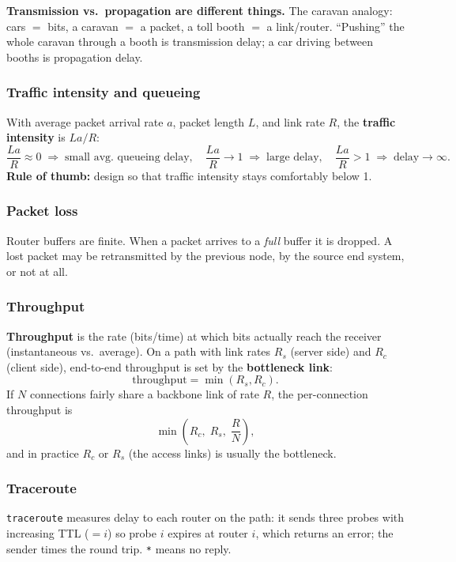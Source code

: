 \documentclass[hidelinks]{article}
\begin{document}
\noindent\textbf{Transmission vs.\ propagation are different things.}
The caravan analogy: cars $=$ bits, a caravan $=$ a packet, a toll booth $=$
a link/router. ``Pushing'' the whole caravan through a booth is transmission
delay; a car driving between booths is propagation delay.

\subsubsection{Traffic intensity and queueing}
With average packet arrival rate $a$, packet length $L$, and link rate $R$,
the \textbf{traffic intensity} is $La/R$:
\[
    \frac{La}{R}\!\approx 0 \;\Rightarrow\; \text{small avg.\ queueing delay},
    \quad
    \frac{La}{R}\!\to 1 \;\Rightarrow\; \text{large delay},
    \quad
    \frac{La}{R} > 1 \;\Rightarrow\; \text{delay} \to \infty.
\]
\textbf{Rule of thumb:} design so that traffic intensity stays comfortably
below 1.

\subsubsection{Packet loss}
Router buffers are finite. When a packet arrives to a \emph{full} buffer it
is dropped. A lost packet may be retransmitted by the previous node, by the
source end system, or not at all.

\subsubsection{Throughput}
\textbf{Throughput} is the rate (bits/time) at which bits actually reach the
receiver (instantaneous vs.\ average). On a path with link rates
$R_s$ (server side) and $R_c$ (client side), end-to-end throughput is set by
the \textbf{bottleneck link}:
\[
    \text{throughput} = \min(R_s, R_c).
\]
If $N$ connections fairly share a backbone link of rate $R$, the per-connection
throughput is
\[
    \min\!\left(R_c,\; R_s,\; \frac{R}{N}\right),
\]
and in practice $R_c$ or $R_s$ (the access links) is usually the bottleneck.

\subsubsection{Traceroute}
\texttt{traceroute} measures delay to each router on the path: it sends three
probes with increasing TTL ($=i$) so probe $i$ expires at router $i$, which
returns an error; the sender times the round trip. \texttt{*} means no reply.
\end{document}

